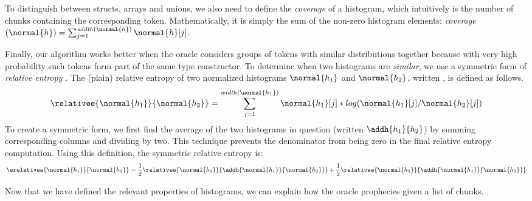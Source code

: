 To distinguish between structs, arrays and unions,
we also need to define the {\em coverage} of a histogram, which
intuitively is the number of chunks containing the corresponding token.
Mathematically, it is simply the sum of the non-zero histogram elements:
{\em coverage}$(\normal{h}) = 
                  \sum_{j=1}^{\mathit{width}(\normal{h})} \normal{h}[j]$.

Finally, our algorithm works better when the oracle considers groups
of tokens with similar distributions together because with very high
probability such tokens form part of the same type constructor. 
To determine when two histograms are {\em similar}, we use
a symmetric form of {\em relative entropy} \cite{Lin91:divergence}.
The (plain) relative entropy
of two normalized histograms $\normal{h_1}$ and $\normal{h_2}$, 
written , is
defined as follows.
\[
 \relativee{\normal{h_1}}{\normal{h_2}} 
   = \sum_{j=1}^{\mathit{width}(\normal{h_1})} \normal{h_1}[j]*log(\normal{h_1}[j]/\normal{h_2}[j])
\]
To create a symmetric form, we first find the average of the two
histograms in question (written $\addh{h_1}{h_2}$)
by summing corresponding columns and dividing by two.  This technique
prevents the denominator from being zero in the 
final relative entropy computation.  Using this definition, the symmetric
relative entropy is:
\[
 \srelativee{\normal{h_1}}{\normal{h_2}} 
   = \frac{1}{2}  \relativee{\normal{h_1}}{\addh{\normal{h_1}}{\normal{h_2}}}
   +  \frac{1}{2}  \relativee{\normal{h_2}}{\addh{\normal{h_1}}{\normal{h_2}}}
\]

Now that we have defined the relevant properties of histograms,
we can explain how the oracle prophecies given a list of chunks.

